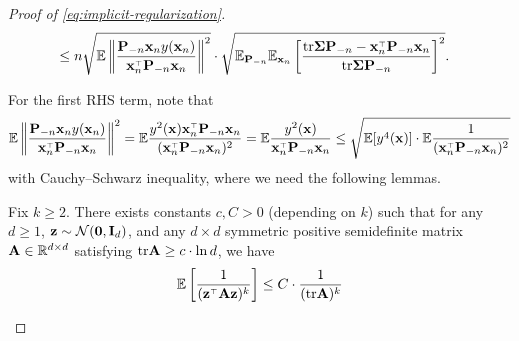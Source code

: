\documentclass[11pt]{article}
\begin{document}
\begin{proof}[Proof of \eqref{eq:implicit-regularization}]
\begin{align}
   &\le n \sqrt{ \E \left\| \frac{ \P_{-n} \x_n y(\x_n) }{\x_n^\top \P_{-n} \x_n } \right\|^2 } \cdot \sqrt{\E_{\P_{-n}} \E_{\x_n} \left[ \frac{ \tr \Sigmab \P_{-n} - \x_n^\top \P_{-n} \x_n }{ \tr \Sigmab \P_{-n} } \right]^2 }. \label{eq:bound-dif-1}
\end{align}

For the first RHS term, note that
\[
  \E \left\| \frac{ \P_{-n} \x_n y(\x_n) }{\x_n^\top \P_{-n} \x_n } \right\|^2 = \E \frac{ y^2(\x) \x_n^\top \P_{-n} \x_n }{ (\x_n^\top \P_{-n} \x_n )^2} = \E \frac{y^2(\x)}{ \x_n^\top \P_{-n} \x_n } \le \sqrt{ \E[y^4(\x)] \cdot \E \frac1{ (\x_n^\top \P_{-n} \x_n)^2 } }
\]
with Cauchy–Schwarz inequality, where we need the following lemmas.

\begin{lemma}\label{lem:inverse-moment-bound}
  Fix $k \geq 2$. There exists constants $c, C > 0$ (depending on $k$)
  such that for any $d \geq 1$,
  $\mathbf z\sim\mathcal{N}(\mathbf 0,\mathbf I_d)$,
  and any $d\times d$ symmetric positive semidefinite matrix
  $\mathbf A \in \mathbb R^{d \times d}$ satisfying $\mathrm{tr} \mathbf A \ge c \cdot \ln d$,
  we have
  \[
    \E \left[ \frac1{ (\z^\top \A \z)^k } \right] \le C \cdot \frac1{ (\tr \A)^k} 
  \]
\end{lemma}


\end{proof}
\end{document}
